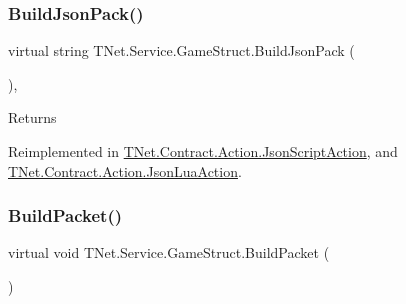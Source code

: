 \mbox{\label{class_t_net_1_1_service_1_1_game_struct_a629b46371ae918050fc7c69aee789d92}} 
\subsubsection{\texorpdfstring{Build\+Json\+Pack()}{BuildJsonPack()}}
{\footnotesize\ttfamily virtual string T\+Net.\+Service.\+Game\+Struct.\+Build\+Json\+Pack (\begin{DoxyParamCaption}{ }\end{DoxyParamCaption})\hspace{0.3cm}{\ttfamily [protected]}, {\ttfamily [virtual]}}





\begin{DoxyReturn}{Returns}

\end{DoxyReturn}


Reimplemented in \mbox{\hyperlink{class_t_net_1_1_contract_1_1_action_1_1_json_script_action_a4bad6f9bab878db2b8ddc3a1d24d4b52}{T\+Net.\+Contract.\+Action.\+Json\+Script\+Action}}, and \mbox{\hyperlink{class_t_net_1_1_contract_1_1_action_1_1_json_lua_action_a3b5e5d5a35643dfc2a610735729c8ee4}{T\+Net.\+Contract.\+Action.\+Json\+Lua\+Action}}.

\mbox{\label{class_t_net_1_1_service_1_1_game_struct_a07c2501acfc1957399e45b1c3539bc70}} 
\subsubsection{\texorpdfstring{Build\+Packet()}{BuildPacket()}}
{\footnotesize\ttfamily virtual void T\+Net.\+Service.\+Game\+Struct.\+Build\+Packet (\begin{DoxyParamCaption}{ }\end{DoxyParamCaption})\hspace{0.3cm}{\ttfamily [virtual]}}



